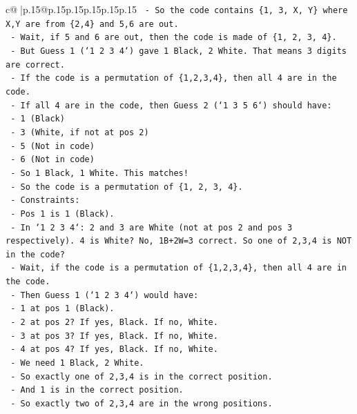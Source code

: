\documentclass{article}
\begin{document}
{\begin{supertabular}{c@{$\;$}|p{.15\linewidth}@{}p{.15\linewidth}p{.15\linewidth}p{.15\linewidth}p{.15\linewidth}p{.15\linewidth}}
{{{\texttt{    {-}   So the code contains \{1, 3, X, Y\} where X,Y are from \{2,4\} and 5,6 are out.} \\
\texttt{    {-}   Wait, if 5 and 6 are out, then the code is made of \{1, 2, 3, 4\}.} \\
\texttt{    {-}   But Guess 1 (`1 2 3 4`) gave 1 Black, 2 White. That means 3 digits are correct.} \\
\texttt{    {-}   If the code is a permutation of \{1,2,3,4\}, then all 4 are in the code.} \\
\texttt{    {-}   If all 4 are in the code, then Guess 2 (`1 3 5 6`) should have:} \\
\texttt{        {-}   1 (Black)} \\
\texttt{        {-}   3 (White, if not at pos 2)} \\
\texttt{        {-}   5 (Not in code)} \\
\texttt{        {-}   6 (Not in code)} \\
\texttt{        {-}   So 1 Black, 1 White. This matches!} \\
\texttt{    {-}   So the code is a permutation of \{1, 2, 3, 4\}.} \\
\texttt{    {-}   Constraints:} \\
\texttt{        {-}   Pos 1 is 1 (Black).} \\
\texttt{        {-}   In `1 2 3 4`: 2 and 3 are White (not at pos 2 and pos 3 respectively). 4 is White? No, 1B+2W=3 correct. So one of 2,3,4 is NOT in the code?} \\
\texttt{        {-}   Wait, if the code is a permutation of \{1,2,3,4\}, then all 4 are in the code.} \\
\texttt{        {-}   Then Guess 1 (`1 2 3 4`) would have:} \\
\texttt{            {-}   1 at pos 1 (Black).} \\
\texttt{            {-}   2 at pos 2? If yes, Black. If no, White.} \\
\texttt{            {-}   3 at pos 3? If yes, Black. If no, White.} \\
\texttt{            {-}   4 at pos 4? If yes, Black. If no, White.} \\
\texttt{            {-}   We need 1 Black, 2 White.} \\
\texttt{            {-}   So exactly one of 2,3,4 is in the correct position.} \\
\texttt{            {-}   And 1 is in the correct position.} \\
\texttt{            {-}   So exactly two of 2,3,4 are in the wrong positions.} \\
}}}
\end{supertabular}}
\end{document}
